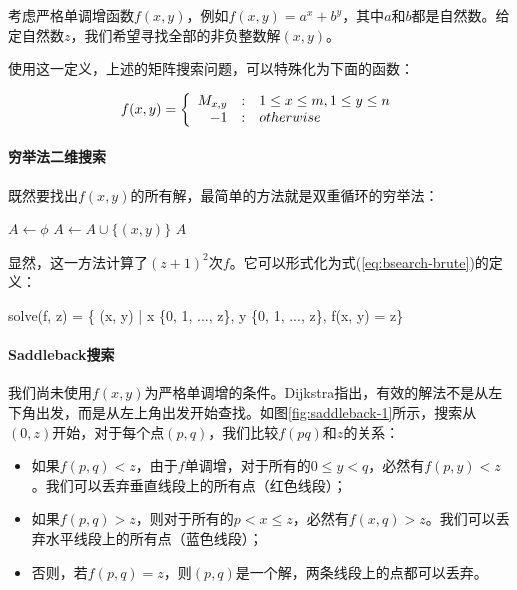 \documentclass[UTF8]{article}
\begin{document}
考虑严格单调增函数$f(x, y)$，例如$f(x, y) = a^x + b^y$，其中$a$和$b$都是自然数。给定自然数$z$，我们希望寻找全部的非负整数解$(x, y)$。

使用这一定义，上述的矩阵搜索问题，可以特殊化为下面的函数：

\[
f(x, y) = \left \{
  \begin{array}
  {r@{\quad:\quad}l}
  M_{x, y} & 1 \leq x \leq m, 1 \leq y \leq n \\
  -1 & otherwise
  \end{array}
\right.
\]

\paragraph{穷举法二维搜索}

既然要找出$f(x, y)$的所有解，最简单的方法就是双重循环的穷举法：

\begin{algorithmic}[1]
  \State $A \gets \phi$
        \State $A \gets A \cup \{(x, y)\}$
      \EndIf
    \EndFor
  \EndFor
  \State \Return $A$
\EndFunction
\end{algorithmic}

显然，这一方法计算了$(z+1)^2$次$f$。它可以形式化为式(\ref{eq:bsearch-brute})的定义：

\be
solve(f, z) = \{ (x, y) | x \in \{0, 1, ..., z\}, y \in \{0, 1, ..., z\}, f(x, y) = z\}
\label{eq:bsearch-brute}
\ee

\paragraph{Saddleback搜索}

我们尚未使用$f(x, y)$为严格单调增的条件。Dijkstra指出\cite{saddle-back}，有效的解法不是从左下角出发，而是从左上角出发开始查找。如图\ref{fig:saddleback-1}所示，搜索从$(0, z)$开始，对于每个点$(p, q)$，我们比较$f(p q)$和$z$的关系：

\begin{itemize}
\item 如果$f(p, q) < z$，由于$f$单调增，对于所有的$0 \leq y < q$，必然有$f(p, y) < z$。我们可以丢弃垂直线段上的所有点（红色线段）；
\item 如果$f(p, q) > z$，则对于所有的$p < x \leq z$，必然有$f(x, q) > z$。我们可以丢弃水平线段上的所有点（蓝色线段）；
\item 否则，若$f(p, q) = z$，则$(p, q)$是一个解，两条线段上的点都可以丢弃。
\end{itemize}
\end{document}
